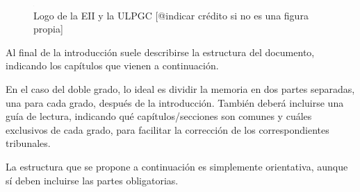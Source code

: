 \begin{figure}[!htbp]
\centering
\includegraphics[width=1]{Ilustraciones/Logo_EII+ULPGC.png}
\caption{Logo de la EII y la ULPGC [@indicar crédito si no es una figura propia]}
\label{fig:logos}
\end{figure}

Al final de la introducción suele describirse la estructura del documento, indicando los capítulos que vienen a continuación.

En el caso del doble grado, lo ideal es dividir la memoria en dos partes separadas, una para cada grado, después de la introducción. También deberá incluirse una guía de lectura, indicando qué capítulos/secciones son comunes y cuáles exclusivos de cada grado, para facilitar la corrección de los correspondientes tribunales.

La estructura que se propone a continuación es simplemente orientativa, aunque sí deben incluirse las partes obligatorias.

